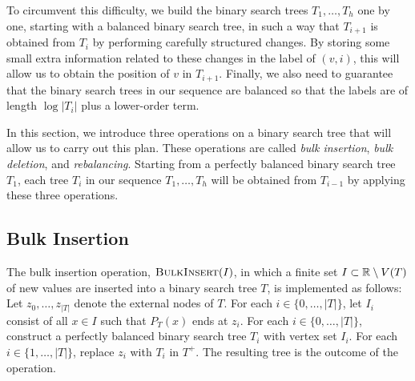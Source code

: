 \documentclass[kpfonts]{patmorin}
\let\le\leqslant
\begin{document}
To circumvent this difficulty, we build the binary search trees $T_1,\ldots,T_h$ one by one, starting with a balanced binary search tree, in such a way that $T_{i+1}$ is obtained from $T_i$ by performing carefully structured changes. By storing some small extra information related to these changes in the label of $(v,i)$, this will allow us to obtain the position of $v$ in $T_{i+1}$.
Finally, we also need to guarantee that the binary search trees in our sequence are balanced so that the labels are of length $\log|T_i|$ plus a lower-order term.

In this section, we introduce three operations on a binary search tree that will allow us to carry out this plan.
These operations are called \emph{bulk insertion}, \emph{bulk deletion}, and \emph{rebalancing}.
Starting from a perfectly balanced binary search tree $T_1$, each tree $T_i$ in our sequence $T_1, \dots, T_h$ will be obtained from $T_{i-1}$ by applying these three operations.




\subsection{Bulk Insertion}

The bulk insertion operation, $\textsc{BulkInsert}(I)$,
in which a finite set $I\subset  \mathbb{R}\setminus V(T)$ of new values are inserted into a binary search tree $T$, is implemented as follows: Let $z_0,\ldots,z_{|T|}$ denote the external nodes of $T$.  For each $i\in\{0,\ldots,|T|\}$, let $I_i$ consist of all $x\in I$ such that $P_T(x)$ ends at $z_i$.
For each $i\in\{0,\ldots,|T|\}$, construct a perfectly balanced binary search tree $T_i$ with vertex set $I_i$.
For each $i\in\{1,\ldots,|T|\}$, replace $z_i$ with $T_i$ in $T^+$.
The resulting tree is the outcome of the operation.
\end{document}
